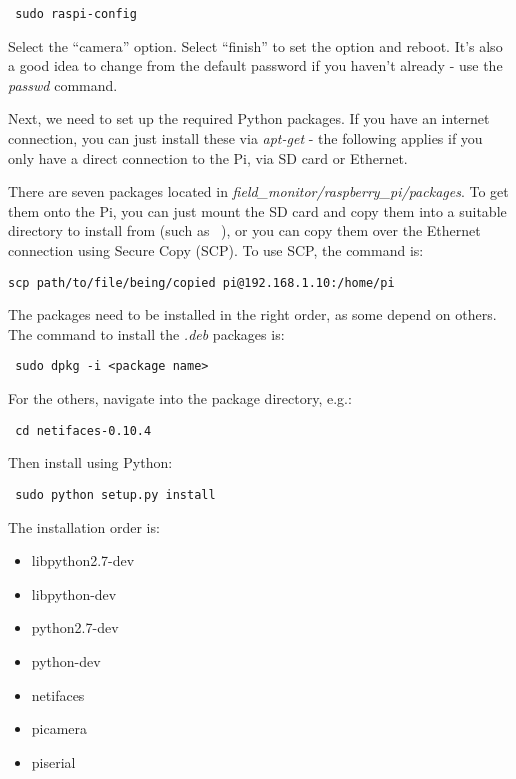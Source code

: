 \documentclass[10pt]{article}
\begin{document}
\begin{verbatim}
 sudo raspi-config
\end{verbatim}

Select the ``camera'' option. Select ``finish'' to set the option and reboot. It's also a good idea to change from the default password if you haven't already - 
use the \textit{passwd} command. 

Next, we need to set up the required Python packages. If you have an internet connection, you can just install these via \textit{apt-get} - the following applies if 
you only have a direct connection to the Pi, via SD card or Ethernet.

There are seven packages located in \textit{field\_monitor/raspberry\_pi/packages}. To get them onto the Pi, you can just mount the SD card
and copy them into a suitable directory to install from (such as ~), or you can copy them over the Ethernet connection using Secure Copy (SCP). To use SCP, the 
command is:

\begin{verbatim}
scp path/to/file/being/copied pi@192.168.1.10:/home/pi
\end{verbatim}

The packages need to be installed in the right order, as some depend on others. The command to install the \textit{.deb} packages is:

\begin{verbatim}
 sudo dpkg -i <package name>
\end{verbatim}

For the others, navigate into the package directory, e.g.:

\begin{verbatim}
 cd netifaces-0.10.4
\end{verbatim}

Then install using Python:

\begin{verbatim}
 sudo python setup.py install
\end{verbatim}

The installation order is:

\begin{itemize}
 \item libpython2.7-dev
 \item libpython-dev 
 \item python2.7-dev 
 \item python-dev 
 \item netifaces
 \item picamera
 \item piserial
\end{itemize}
\end{document}
